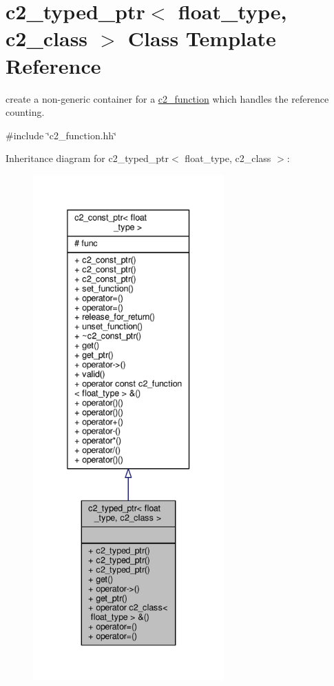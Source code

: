 \hypertarget{classc2__typed__ptr}{}\section{c2\+\_\+typed\+\_\+ptr$<$ float\+\_\+type, c2\+\_\+class $>$ Class Template Reference}
\label{classc2__typed__ptr}


create a non-\/generic container for a \hyperlink{classc2__function}{c2\+\_\+function} which handles the reference counting.  




{\ttfamily \#include \char`\"{}c2\+\_\+function.\+hh\char`\"{}}



Inheritance diagram for c2\+\_\+typed\+\_\+ptr$<$ float\+\_\+type, c2\+\_\+class $>$\+:
\nopagebreak
\begin{figure}[H]
\begin{center}
\leavevmode
\includegraphics[height=550pt]{classc2__typed__ptr__inherit__graph}
\end{center}
\end{figure}


